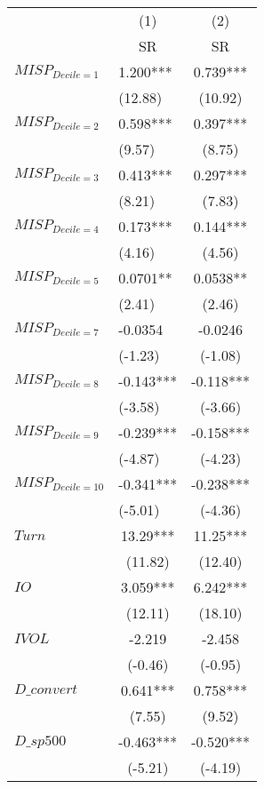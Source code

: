 \begin{tabular}{llc}
\toprule
        & \multicolumn{1}{c}{(1)} & (2) \\
        & \multicolumn{1}{c}{SR} & SR \\
\midrule
$MISP_{Decile = 1} $ & 1.200*** & 0.739*** \\
        & (12.88) & (10.92) \\
$MISP_{Decile = 2} $ & 0.598*** & 0.397*** \\
        & (9.57)  & (8.75) \\
$MISP_{Decile = 3} $ & 0.413*** & 0.297*** \\
        & (8.21)  & (7.83) \\
$MISP_{Decile = 4} $ & 0.173*** & 0.144*** \\
        & (4.16)  & (4.56) \\
$MISP_{Decile = 5} $ & 0.0701** & 0.0538** \\
        & (2.41)  & (2.46) \\
$MISP_{Decile = 7} $ & -0.0354 & -0.0246 \\
        & (-1.23) & (-1.08) \\
$MISP_{Decile = 8} $ & -0.143*** & -0.118*** \\
        & (-3.58) & (-3.66) \\
$MISP_{Decile = 9} $ & -0.239*** & -0.158*** \\
        & (-4.87) & (-4.23) \\
$MISP_{Decile = 10} $ & -0.341*** & -0.238*** \\
        & (-5.01) & (-4.36) \\
$Turn$  & \multicolumn{1}{c}{13.29***} & 11.25*** \\
        & \multicolumn{1}{c}{(11.82)} & (12.40) \\
$IO$    & \multicolumn{1}{c}{3.059***} & 6.242*** \\
        & \multicolumn{1}{c}{(12.11)} & (18.10) \\
$IVOL$  & \multicolumn{1}{c}{-2.219} & -2.458 \\
        & \multicolumn{1}{c}{(-0.46)} & (-0.95) \\
$D\_convert$ & \multicolumn{1}{c}{0.641***} & 0.758*** \\
        & \multicolumn{1}{c}{(7.55)} & (9.52) \\
$D\_sp500$ & \multicolumn{1}{c}{-0.463***} & -0.520*** \\
        & \multicolumn{1}{c}{(-5.21)} & (-4.19) \\

\end{tabular}
